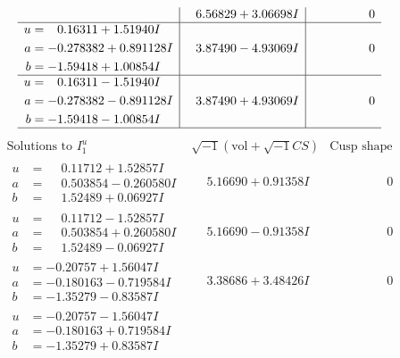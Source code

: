 \documentclass[1p]{elsarticle_modified}
\theoremstyle{definition}
\newcommand{\I}{\sqrt{-1}}
\begin{document}
$$\begin{array}{c|c|c}
 & \phantom{-}6.56829 + 3.06698 I & \phantom{-0.000000 } 0 \\ \hline\begin{aligned}
u &= \phantom{-}0.16311 + 1.51940 I \\
a &= -0.278382 + 0.891128 I \\
b &= -1.59418 + 1.00854 I\end{aligned}
 & \phantom{-}3.87490 - 4.93069 I & \phantom{-0.000000 } 0 \\ \hline\begin{aligned}
u &= \phantom{-}0.16311 - 1.51940 I \\
a &= -0.278382 - 0.891128 I \\
b &= -1.59418 - 1.00854 I\end{aligned}
 & \phantom{-}3.87490 + 4.93069 I & \phantom{-0.000000 } 0\\
 \hline 
 \end{array}$$\newpage$$\begin{array}{c|c|c}  
\text{Solutions to }I^u_{1}& \I (\text{vol} + \sqrt{-1}CS) & \text{Cusp shape}\\
 \hline 
\begin{aligned}
u &= \phantom{-}0.11712 + 1.52857 I \\
a &= \phantom{-}0.503854 - 0.260580 I \\
b &= \phantom{-}1.52489 + 0.06927 I\end{aligned}
 & \phantom{-}5.16690 + 0.91358 I & \phantom{-0.000000 } 0 \\ \hline\begin{aligned}
u &= \phantom{-}0.11712 - 1.52857 I \\
a &= \phantom{-}0.503854 + 0.260580 I \\
b &= \phantom{-}1.52489 - 0.06927 I\end{aligned}
 & \phantom{-}5.16690 - 0.91358 I & \phantom{-0.000000 } 0 \\ \hline\begin{aligned}
u &= -0.20757 + 1.56047 I \\
a &= -0.180163 - 0.719584 I \\
b &= -1.35279 - 0.83587 I\end{aligned}
 & \phantom{-}3.38686 + 3.48426 I & \phantom{-0.000000 } 0 \\ \hline\begin{aligned}
u &= -0.20757 - 1.56047 I \\
a &= -0.180163 + 0.719584 I \\
b &= -1.35279 + 0.83587 I\end{aligned}

\end{array}$$
\end{document}
